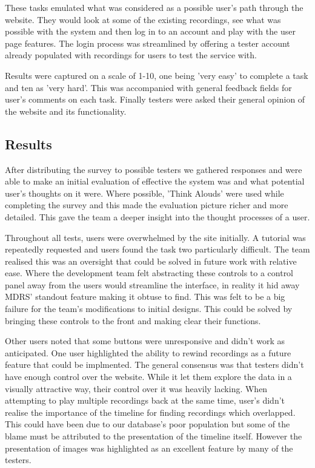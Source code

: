 \documentclass{l3proj}
\begin{document}
These tasks emulated what was considered as a possible user's path through the website. They would look at some of the existing recordings, see what was possible with the system and then log in to an account and play with the user page features. The login process was streamlined by offering a tester account already populated with recordings for users to test the service with.

Results were captured on a scale of 1-10, one being 'very easy' to complete a task and ten as 'very hard'. This was accompanied with general feedback fields for user's comments on each task. Finally testers were asked their general opinion of the website and its functionality.

\subsection{Results}		After distributing the survey to possible testers we gathered responses and were able to make an initial evaluation of effective the system was and what potential user's thoughts on it were. Where possible, 'Think Alouds' were used while completing the survey and this made the evaluation picture richer and more detailed. This gave the team a deeper insight into the thought processes of a user.

Throughout all tests, users were overwhelmed by the site initially. A tutorial was repeatedly requested and users found the task two particularly difficult. The team realised this was an oversight that could be solved in future work with relative ease. Where the development team felt abstracting these controls to a control panel away from the users would streamline the interface, in reality it hid away MDRS' standout feature making it obtuse to find. This was felt to be a big failure for the team's modifications to initial designs. This could be solved by bringing these controls to the front and making clear their functions.

Other users noted that some buttons were unresponsive and didn't work as anticipated. One user highlighted the ability to rewind recordings as a future feature that could be implmented. The general consensus was that testers didn't have enough control over the website. While it let them explore the data in a visually attractive way, their control over it was heavily lacking. When attempting to play multiple recordings back at the same time, user's didn't realise the importance of the timeline for finding recordings which overlapped. This could have been due to our database's poor population but some of the blame must be attributed to the presentation of the timeline itself. However the presentation of images was highlighted as an excellent feature by many of the testers.
\end{document}

